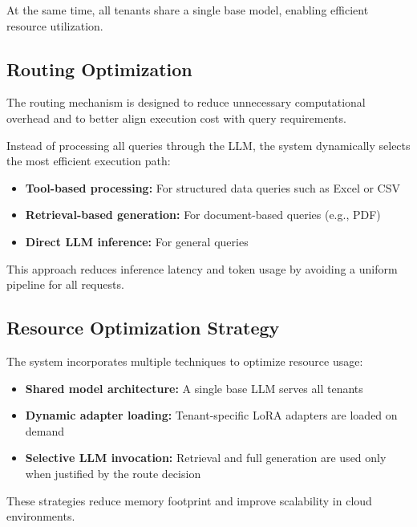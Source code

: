 At the same time, all tenants share a single base model, enabling efficient resource utilization.

\subsection{Routing Optimization}

The routing mechanism is designed to reduce unnecessary computational overhead and to better align execution cost with query requirements.

Instead of processing all queries through the LLM, the system dynamically selects the most efficient execution path:

\begin{itemize}
    \item \textbf{Tool-based processing:} For structured data queries such as Excel or CSV
    \item \textbf{Retrieval-based generation:} For document-based queries (e.g., PDF)
    \item \textbf{Direct LLM inference:} For general queries
\end{itemize}

This approach reduces inference latency and token usage by avoiding a uniform pipeline for all requests.

\subsection{Resource Optimization Strategy}

The system incorporates multiple techniques to optimize resource usage:

\begin{itemize}
    \item \textbf{Shared model architecture:} A single base LLM serves all tenants
    \item \textbf{Dynamic adapter loading:} Tenant-specific LoRA adapters are loaded on demand
    \item \textbf{Selective LLM invocation:} Retrieval and full generation are used only when justified by the route decision
\end{itemize}

These strategies reduce memory footprint and improve scalability in cloud environments.

